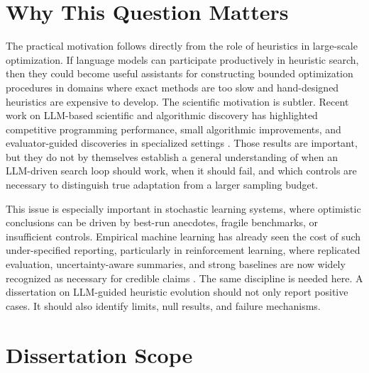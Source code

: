 \section{Why This Question Matters}
\label{sec:intro-motivation}

The practical motivation follows directly from the role of heuristics in large-scale optimization.
If language models can participate productively in heuristic search, then they could become useful
assistants for constructing bounded optimization procedures in domains where exact methods are too
slow and hand-designed heuristics are expensive to develop. The scientific motivation is subtler.
Recent work on LLM-based scientific and algorithmic discovery has highlighted competitive
programming performance, small algorithmic improvements, and evaluator-guided discoveries in
specialized settings
\cite{li2022alphacode,mankowitz2023alphadev,romeraparedes2024funsearch}. Those results are
important, but they do not by themselves establish a general understanding of when an LLM-driven
search loop should work, when it should fail, and which controls are necessary to distinguish true
adaptation from a larger sampling budget.

This issue is especially important in stochastic learning systems, where optimistic conclusions can
be driven by best-run anecdotes, fragile benchmarks, or insufficient controls. Empirical machine
learning has already seen the cost of such under-specified reporting, particularly in reinforcement
learning, where replicated evaluation, uncertainty-aware summaries, and strong baselines are now
widely recognized as necessary for credible claims \cite{henderson2018drltm,agarwal2021precipice}.
The same discipline is needed here. A dissertation on LLM-guided heuristic evolution should not
only report positive cases. It should also identify limits, null results, and failure mechanisms.

\section{Dissertation Scope}
\label{sec:intro-scope}

